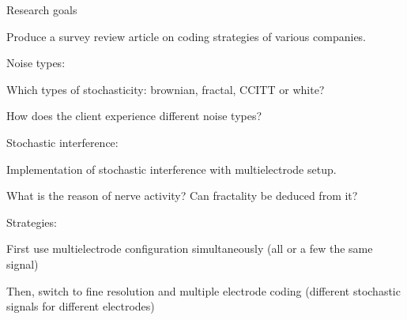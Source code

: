 Research goals


Produce a survey review article on coding strategies of various companies.


Noise types:

Which types of stochasticity: brownian, fractal, CCITT or white?

How does the client experience different noise types?



Stochastic interference:

Implementation of stochastic interference with multielectrode setup.

What is the reason of nerve activity? Can fractality be deduced from it?


Strategies:

First use multielectrode configuration simultaneously (all or a few the same signal)

Then, switch to fine resolution and multiple electrode coding (different stochastic signals
for different electrodes)



